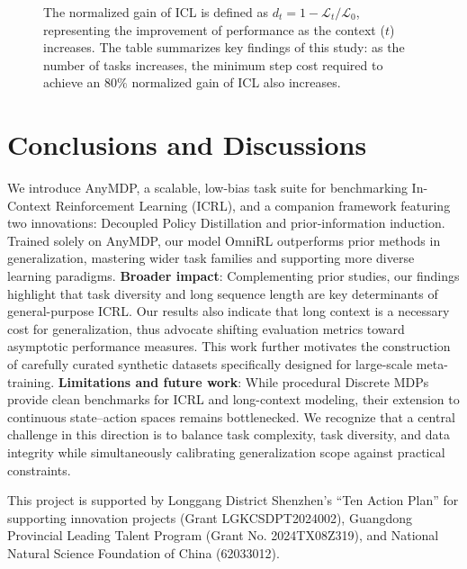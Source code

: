 \documentclass{article}
\begin{document}
\begin{figure}[!htbp]
{The normalized gain of ICL is defined as $d_t=1-\mathcal{L}_t/\mathcal{L}_0$, representing the improvement of performance as the context ($t$) increases.
The table summarizes key findings of this study: as the number of tasks increases, the minimum step cost required to achieve an $80\%$ normalized gain of ICL also increases.
}
\label{fig:task_ablation}
\vspace{-0.10in}
\end{figure}
\section{Conclusions and Discussions} \label{sec:conclusion}
We introduce AnyMDP, a scalable, low-bias task suite for benchmarking In-Context Reinforcement Learning (ICRL), and a companion framework featuring two innovations: Decoupled Policy Distillation and prior-information induction.
Trained solely on AnyMDP, our model OmniRL outperforms prior methods in generalization, mastering wider task families and supporting more diverse learning paradigms.
\textbf{Broader impact}: Complementing prior studies, our findings highlight that task diversity and long sequence length are key determinants of general-purpose ICRL. Our results also indicate that long context is a necessary cost for generalization, thus advocate shifting evaluation metrics toward asymptotic performance measures. This work further motivates the construction of carefully curated synthetic datasets specifically designed for large-scale meta-training.
\textbf{Limitations and future work}: While procedural Discrete MDPs provide clean benchmarks for ICRL and long-context modeling, their extension to continuous state–action spaces remains bottlenecked. We recognize that a central challenge in this direction is to balance task complexity, task diversity, and data integrity while simultaneously calibrating generalization scope against practical constraints.
\clearpage
\begin{ack}
This project is supported by Longgang District Shenzhen's “Ten Action Plan” for supporting innovation projects (Grant LGKCSDPT2024002), Guangdong Provincial Leading Talent Program (Grant No. 2024TX08Z319), and National Natural Science Foundation of China (62033012).
\end{ack}


\newpage
\end{document}
